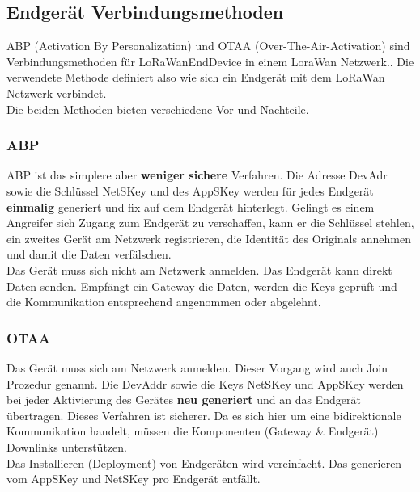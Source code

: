 \documentclass[11pt,english,german]{report}
\theoremstyle{definition}
\begin{document}
\subsection{Endgerät Verbindungsmethoden}
ABP (Activation By Personalization) und OTAA (Over-The-Air-Activation) sind Verbindungsmethoden für \gls{LoRaWanEndDevice} in einem LoraWan Netzwerk.\cite{jaguar}. Die verwendete Methode definiert also wie sich ein Endgerät mit dem LoRaWan Netzwerk verbindet. \\[0.3cm]
Die beiden Methoden bieten verschiedene Vor und Nachteile.

\subsubsection{ABP}
ABP ist das simplere aber \textbf{weniger sichere} Verfahren. Die Adresse DevAdr sowie die Schlüssel \gls{NetSKey} und des \gls{AppSKey} werden für jedes Endgerät \textbf{einmalig} generiert und fix auf dem Endgerät hinterlegt. Gelingt es einem Angreifer sich Zugang zum Endgerät zu verschaffen, kann er die Schlüssel stehlen, ein zweites Gerät am Netzwerk registrieren, die Identität des Originals annehmen und damit die Daten verfälschen.\\[0.3cm]
Das Gerät muss sich nicht am Netzwerk anmelden. Das Endgerät kann direkt Daten senden. Empfängt ein Gateway die Daten, werden die Keys geprüft und die Kommunikation entsprechend angenommen oder abgelehnt.

\subsubsection{OTAA}
Das Gerät muss sich am Netzwerk anmelden. Dieser Vorgang wird auch Join Prozedur genannt. Die \gls{DevAddr} sowie die Keys NetSKey und AppSKey werden bei jeder Aktivierung des Gerätes \textbf{neu generiert} und an das Endgerät übertragen. Dieses Verfahren ist sicherer. Da es sich hier um eine bidirektionale Kommunikation handelt, müssen die Komponenten (Gateway \& Endgerät) Downlinks unterstützen.\\[0.3cm]
Das Installieren (Deployment) von Endgeräten wird vereinfacht. Das generieren vom AppSKey und NetSKey pro Endgerät entfällt. 
\end{document}
